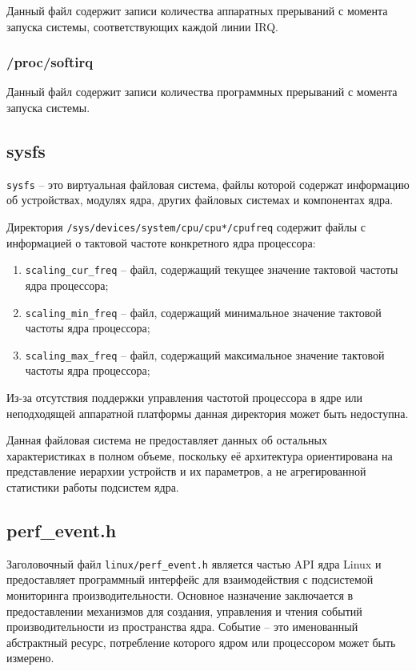 Данный файл содержит записи количества аппаратных прерываний с момента запуска системы, соответствующих каждой линии IRQ.

\subsubsection{/proc/softirq}

Данный файл содержит записи количества программных прерываний с момента запуска системы.

\subsection{sysfs}

\texttt{sysfs} -- это виртуальная файловая система, файлы которой содержат информацию об устройствах, модулях ядра, других файловых системах и компонентах ядра.

Директория \texttt{/sys/devices/system/cpu/cpu*/cpufreq} содержит файлы с информацией о тактовой частоте конкретного ядра процессора:
\begin{enumerate}
	\item \texttt{scaling\_cur\_freq} -- файл, содержащий текущее значение тактовой частоты ядра процессора;
	\item \texttt{scaling\_min\_freq} -- файл, содержащий минимальное значение тактовой частоты ядра процессора;
	\item \texttt{scaling\_max\_freq} -- файл, содержащий максимальное значение тактовой частоты ядра процессора;
\end{enumerate}

Из-за отсутствия поддержки управления частотой процессора в ядре или неподходящей аппаратной платформы данная директория может быть недоступна.

Данная файловая система не предоставляет данных об остальных характеристиках в полном объеме, поскольку её архитектура ориентирована на представление иерархии устройств и их параметров, а не агрегированной статистики работы подсистем ядра. 

\subsection{perf\_event.h}

Заголовочный файл \texttt{linux/perf\_event.h} является частью API ядра Linux и предоставляет программный интерфейс для взаимодействия с подсистемой мониторинга производительности. Основное назначение заключается в предоставлении механизмов для создания, управления и чтения событий производительности из пространства ядра. Событие -- это именованный абстрактный ресурс, потребление которого ядром или процессором может быть измерено.

